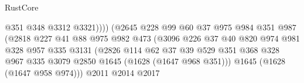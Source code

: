 \begin{lexlean}{RustCore}
\begin{coremodule}
                                                @351
                                                @348
                                                @3312
                                                @3321))))
                                        (@2645
                                          @228
                                          @99
                                          @60
                                          @37
                                          @975
                                          @984
                                          @351
                                          @987
                                          (@2818
                                            @227
                                            @41
                                            @88
                                            @975
                                            @982
                                            @473
                                            (@3096
                                              @226
                                              @37
                                              @40
                                              @820
                                              @974
                                              @981
                                              @328
                                              @957
                                              @335
                                              @3131
                                              (@2826
                                                @114
                                                @62
                                                @37
                                                @39
                                                @529
                                                @351
                                                @368
                                                @328
                                                @967
                                                @335
                                                @3079
                                                @2850
                                                @1645
                                                (@1628 (@1647 @968 @351)))
                                              @1645
                                              (@1628 (@1647 @958 @974)))
                                            @2011
                                            @2014
                                            @2017

\end{coremodule}
\end{lexlean}
